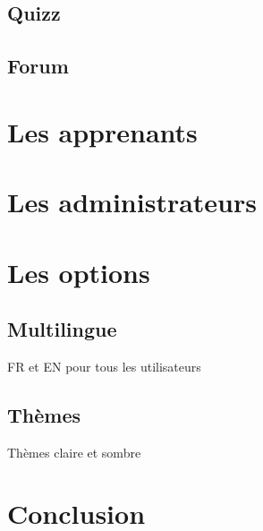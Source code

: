 \documentclass[a4paper,10pt]{article}
\begin{document}
\subsection{Quizz}
\subsection{Forum}


\section{Les apprenants}

\section{Les administrateurs}


\section{Les options}
\subsection{Multilingue}
FR et EN pour tous les utilisateurs 

\subsection{Thèmes}
Thèmes claire et sombre

\section{Conclusion}
\end{document}

